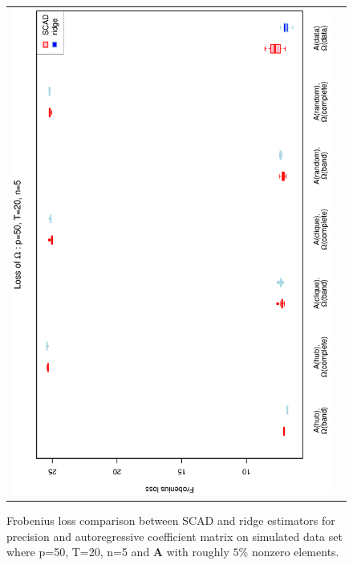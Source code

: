 \begin{figure}[h!]
\begin{tabular}{cc}
\includegraphics[scale=0.45,angle=270]{LossOmega50T20N5_5.eps}
\end{tabular}
\caption{Frobenius loss comparison between SCAD and ridge estimators for precision and autoregressive coefficient matrix on simulated data set where p=50, T=20, n=5  and $\mathbf{A}$ with roughly $5\%$ nonzero elements.}
\label{figSM:Loss50T20N5_5}
\end{figure}
\clearpage


